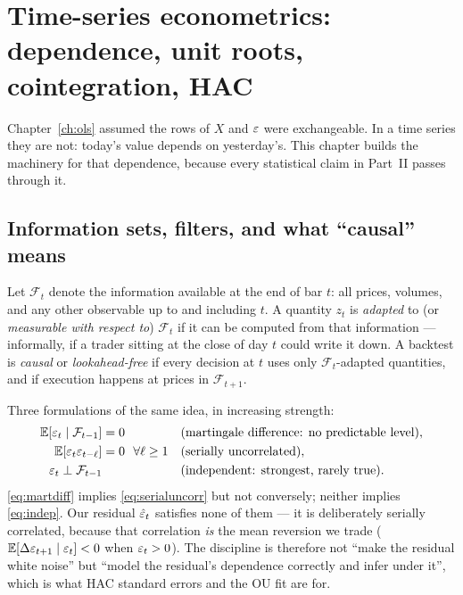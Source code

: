 \section{Time-series econometrics: dependence, unit roots, cointegration, HAC}
\label{ch:timeseries}

Chapter~\ref{ch:ols} assumed the rows of $X$ and $\varepsilon$ were exchangeable. In a time
series they are not: today's value depends on yesterday's. This chapter builds the
machinery for that dependence, because every statistical claim in Part~II passes through
it.

\subsection{Information sets, filters, and what ``causal'' means}
\label{sec:ts:causality}

Let $\mathcal F_t$ denote the information available at the end of bar $t$: all prices,
volumes, and any other observable up to and including $t$. A quantity $z_t$ is
\emph{adapted} to (or \emph{measurable with respect to}) $\mathcal F_t$ if it can be
computed from that information --- informally, if a trader sitting at the close of day
$t$ could write it down. A backtest is \emph{causal} or \emph{lookahead-free} if every
decision at $t$ uses only $\mathcal F_t$-adapted quantities, and if execution happens at
prices in $\mathcal F_{t+1}$.

Three formulations of the same idea, in increasing strength:
\begin{align}
  \mathbb{E}[\varepsilon_t\mid \mathcal F_{t-1}] &= 0 &&\text{(martingale difference: no predictable level)}, \label{eq:martdiff}\\
  \mathbb{E}[\varepsilon_t\varepsilon_{t-\ell}] &= 0\ \ \forall \ell\ge1 &&\text{(serially uncorrelated)}, \label{eq:serialuncorr}\\
  \varepsilon_t \perp \mathcal F_{t-1} &&&\text{(independent: strongest, rarely true)}. \label{eq:indep}
\end{align}
\eqref{eq:martdiff} implies \eqref{eq:serialuncorr} but not conversely; neither implies
\eqref{eq:indep}. Our residual $\hat{\varepsilon}_t$ satisfies none of them --- it is deliberately
serially correlated, because that correlation \emph{is} the mean reversion we trade
($\mathbb{E}[\Delta\varepsilon_{t+1}\mid\varepsilon_t]<0$ when $\varepsilon_t>0$). The discipline is therefore not
``make the residual white noise'' but ``model the residual's dependence correctly and
infer under it'', which is what HAC standard errors and the OU fit are for.

